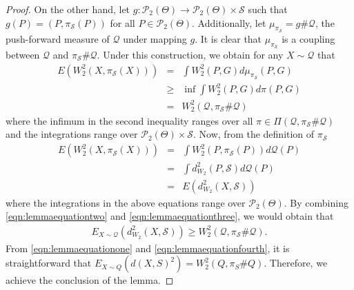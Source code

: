 \begin{proof}
On the other hand, let ${\displaystyle g:\mathcal{P}_{2}(\Theta)  \to \mathcal{P}_{2}(\Theta) \times \mathcal{S}}$ 
such that $g(P)=(P,\pi_{\mathcal{S}}(P))$ for all $P \in \mathcal{P}_{2}(\Theta)$. Additionally, let 
$\mu _{\pi _\mathcal{S} } = g \# \mathcal{Q}$, the push-forward measure of $\mathcal{Q}$ under mapping $g$. It is clear that $\mu _{\pi _\mathcal{S}}$ is a coupling between $\mathcal{Q}$ and $\pi _\mathcal{S} \# \mathcal{Q}$. 
Under this construction, we obtain for any $X \sim \mathcal{Q}$ that
\begin{eqnarray}
 E\left(W_{2}^{2}(X,\pi _\mathcal{S} (X))\right) & = & \int {W_{2}^{2}(P,G) } d\mu _{\pi _\mathcal{S}} (P,G) \nonumber \\
 & \geq & \mathop {\inf } \int {W_{2}^{2}(P,G)} d\pi (P,G) \nonumber \\
& = & W_2^2 (\mathcal{Q},\pi _\mathcal{S} \# \mathcal{Q}) \label{eqn:lemmaequationtwo}
\end{eqnarray}
where the infimum in the second inequality ranges over all $\pi  \in \Pi (\mathcal{Q},\pi _\mathcal{S} \# \mathcal{Q})$ and the integrations range over $\mathcal{P}_{2}(\Theta) \times \mathcal{S}$. Now, from the definition of $\pi_{\mathcal{S}}$
\begin{eqnarray}
E(W_{2}^{2}(X,\pi _\mathcal{S} (X))) & = & \int {W_{2}^{2}(P,\pi _\mathcal{S}(P))}d\mathcal{Q}(P) \nonumber \\
& = & \int {d_{W_{2}}^{2}(P,\mathcal{S})} d\mathcal{Q}(P) \nonumber \\
& = & E(d_{W_{2}}^{2}(X,\mathcal{S})) \label{eqn:lemmaequationthree}
\end{eqnarray}
where the integrations in the above equations range over $\mathcal{P}_{2}(\Theta)$. By combining \eqref{eqn:lemmaequationtwo} and \eqref{eqn:lemmaequationthree}, we would obtain that
\begin{eqnarray}
E_{X \sim \mathcal{Q}} (d^{2}_{W_{2}}(X,\mathcal{S})) \ge W_2^2 (\mathcal{Q},\pi _\mathcal{S} \# \mathcal{Q}). \label{eqn:lemmaequationfourth}
\end{eqnarray}
From \eqref{eqn:lemmaequationone} and \eqref{eqn:lemmaequationfourth}, it is straightforward that $E_{X \sim Q} (d(X,S)^2 ) = W_2^2 (Q,\pi _S  \# Q)$. Therefore, we achieve the conclusion of the lemma.
\end{proof}

